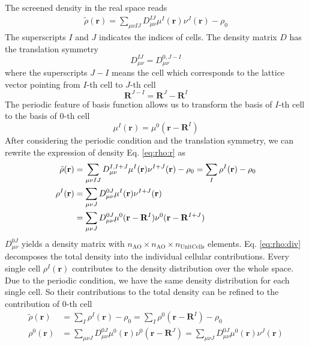 \documentclass{article}
\begin{document}
The screened density in the real space reads
\begin{align}
  \tilde{\rho}(\mathbf{r}) = \sum_{\mu \nu IJ}D_{\mu\nu}^{IJ}
  \mu^{I}(\mathbf{r})\nu^{J}(\mathbf{r}) - \rho_0
  \label{eq:rho:r}
\end{align}
The superscripts $I$ and $J$ indicates the indices of cells.
The density matrix $D$ has the translation symmetry
\begin{equation}
  D_{\mu\nu}^{IJ} = D_{\mu\nu}^{0,J-I}
  \label{}
\end{equation}
where the superscripts $J-I$ means the cell which corresponds to the lattice
vector pointing from $I$-th cell to $J$-th cell
\begin{equation}
  \mathbf{R}^{J-I} = \mathbf{R}^J - \mathbf{R}^I
  \label{}
\end{equation}
The periodic feature of basis function allows us to transform the basis of $I$-th cell to
the basis of $0$-th cell
\begin{equation}
  \mu^I(\mathbf{r}) = \mu^0(\mathbf{r}-\mathbf{R}^I)
  \label{}
\end{equation}
After considering the periodic condition and the translation symmetry,
we can rewrite the expression of density Eq. \eqref{eq:rho:r} as
\begin{align}
  \tilde{\rho}(\mathbf{r})
  &=\sum_{\mu\nu IJ}D_{\mu\nu}^{I,I+J}
  \mu^I(\mathbf{r})\nu^{I+J}(\mathbf{r}) - \rho_0
  =\sum_{I} \rho^I(\mathbf{r}) - \rho_0
  \label{eq:rho:div} \\
  \rho^I(\mathbf{r})
  &=\sum_{\mu\nu J}D_{\mu\nu}^{0J}
  \mu^I(\mathbf{r})\nu^{I+J}(\mathbf{r}) \notag\\
  &=\sum_{\mu\nu J}D_{\mu\nu}^{0J}
  \mu^0(\mathbf{r}-\mathbf{R}^I)\nu^0(\mathbf{r}-\mathbf{R}^{I+J})
  \label{eq:rho:ra}
\end{align}
$D_{\mu\nu}^{0J}$ yields a density matrix with
$n_\text{AO} \times n_\text{AO} \times n_\text{UnitCells}$ elements.
Eq. \eqref{eq:rho:div} decomposes the total density into the individual
cellular contributions.
Every single cell $\rho^I(\mathbf{r})$ contributes to the density
distribution over the whole space.
Due to the periodic condition, 
we have the same density distribution for each single cell.
So their contributions to the total density can be refined to the contribution
of $0$-th cell
\begin{align}
  \tilde{\rho}(\mathbf{r})
  &=\sum_{I}\rho^I(\mathbf{r}) - \rho_0
  = \sum_{I}\rho^0(\mathbf{r}-\mathbf{R}^I) - \rho_0
  \label{eq:rho:r0} \\
  \rho^0(\mathbf{r})
  &=\sum_{\mu\nu J}D_{\mu\nu}^{0J}
  \mu^0(\mathbf{r})\nu^0(\mathbf{r}-\mathbf{R}^{J})
  = \sum_{\mu\nu J}D_{\mu\nu}^{0J}
  \mu^0(\mathbf{r})\nu^J(\mathbf{r})
\end{align}
\end{document}
